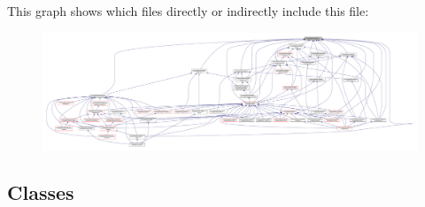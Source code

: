 This graph shows which files directly or indirectly include this file\+:
\nopagebreak
\begin{figure}[H]
\begin{center}
\leavevmode
\includegraphics[width=350pt]{gtest-port_8h__dep__incl}
\end{center}
\end{figure}
\subsection*{Classes}
